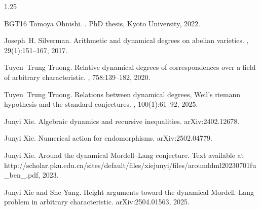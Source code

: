 \documentclass[12pt]{amsart}
\begin{document}
\begin{spacing}{1.25}
\begin{thebibliography}{BGT16}
Tomoya Ohnishi.
.
\newblock PhD thesis, Kyoto University, 2022.

Joseph~H. Silverman.
\newblock Arithmetic and dynamical degrees on abelian varieties.
, 29(1):151--167, 2017.

Tuyen~Trung Truong.
\newblock Relative dynamical degrees of correspondences over a field of
  arbitrary characteristic.
, 758:139--182, 2020.

Tuyen~Trung Truong.
\newblock Relations between dynamical degrees, {W}eil's riemann hypothesis and
  the standard conjectures.
, 100(1):61--92, 2025.

Junyi Xie.
\newblock Algebraic dynamics and recursive inequalities.
\newblock arXiv:2402.12678.

Junyi Xie.
\newblock Numerical action for endomorphisms.
\newblock arXiv:2502.04779.

Junyi Xie.
\newblock Around the dynamical {M}ordell--{L}ang conjecture.
\newblock Text available at
  http://scholar.pku.edu.cn/sites/default/files/xiejunyi/files/arounddml20230701fu\_ben\_.pdf,
  2023.

Junyi Xie and She Yang.
\newblock Height arguments toward the dynamical {M}ordell--{L}ang problem in
  arbitrary characteristic.
\newblock arXiv:2504.01563, 2025.

\end{thebibliography}

\end{spacing}
\end{document}
